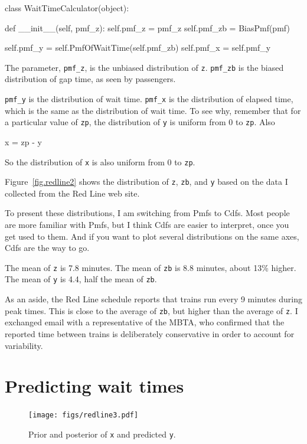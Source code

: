 \documentclass[12pt]{book}
\theoremstyle{exercise}
\newcommand{\py}[1]{{\tt #1}}%
\begin{document}
\begin{code}
class WaitTimeCalculator(object):

    def __init__(self, pmf_z):
        self.pmf_z = pmf_z
        self.pmf_zb = BiasPmf(pmf)

        self.pmf_y = self.PmfOfWaitTime(self.pmf_zb)
        self.pmf_x = self.pmf_y
\end{code}

The parameter, \verb"pmf_z", is the unbiased distribution of \py{z}.
\verb"pmf_zb" is the biased distribution of gap time, as seen by
passengers.

\verb"pmf_y" is the distribution of wait time.  \verb"pmf_x" is the
distribution of elapsed time, which is the same as the distribution of
wait time.  To see why, remember that for a particular value of
\py{zp}, the distribution of \py{y} is uniform from 0 to \py{zp}.
Also
%
\begin{code}
x = zp - y
\end{code}
%
So the distribution of \py{x} is also uniform from 0 to \py{zp}.

Figure~\ref{fig.redline2} shows the distribution of \py{z}, \py{zb},
and \py{y} based on the data I collected from the Red Line web site.

To present these distributions, I am switching from Pmfs to Cdfs.
Most people are more familiar with Pmfs, but I think Cdfs are easier
to interpret, once you get used to them.  And if you want to plot
several distributions on the same axes, Cdfs are the way to go.

The mean of \py{z} is 7.8 minutes.  The mean of \py{zb} is 8.8
minutes, about 13\% higher.  The mean of \py{y} is 4.4, half
the mean of \py{zb}.

As an aside, the Red Line schedule reports that trains run every
9 minutes during peak times.  This is close to the average of
\py{zb}, but higher than the average of \py{z}.  I exchanged email
with a representative of the MBTA, who confirmed that the reported
time between trains is deliberately conservative in order to
account for variability.


\section{Predicting wait times}
\label{elapsed}

\begin{figure}
\centerline{\texttt{[image: figs/redline3.pdf]}}
\caption{Prior and posterior of \py{x} and predicted \py{y}. }
\label{fig.redline3}
\end{figure}
\end{document}
